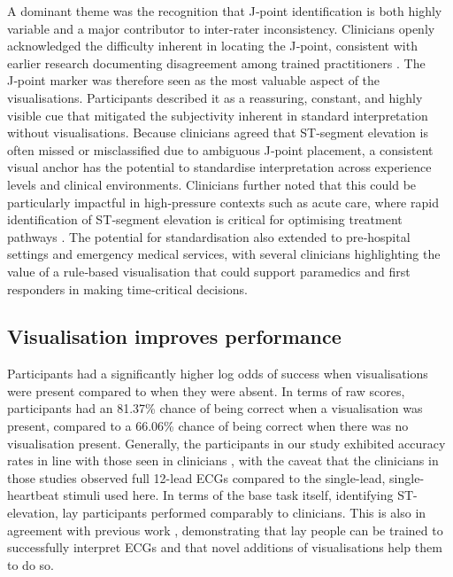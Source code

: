 \documentclass[
  10pt,
  letterpaper,
]{article}
\begin{document}
A dominant theme was the recognition that J‑point identification is both
highly variable and a major contributor to inter-rater inconsistency.
Clinicians openly acknowledged the difficulty inherent in locating the
J‑point, consistent with earlier research documenting disagreement among
trained practitioners \citep{carley_2002, erling_2004}. The J‑point
marker was therefore seen as the most valuable aspect of the
visualisations. Participants described it as a reassuring, constant, and
highly visible cue that mitigated the subjectivity inherent in standard
interpretation without visualisations. Because clinicians agreed that
ST‑segment elevation is often missed or misclassified due to ambiguous
J‑point placement, a consistent visual anchor has the potential to
standardise interpretation across experience levels and clinical
environments. Clinicians further noted that this could be particularly
impactful in high‑pressure contexts such as acute care, where rapid
identification of ST‑segment elevation is critical for optimising
treatment pathways \cite{ibanez_2018}. The potential for standardisation
also extended to pre‑hospital settings and emergency medical services,
with several clinicians highlighting the value of a rule‑based
visualisation that could support paramedics and first responders in
making time‑critical decisions.

\subsection{Visualisation improves
performance}\label{sec-vis-improves-performance}

Participants had a significantly higher log odds of success when
visualisations were present compared to when they were absent. In terms
of raw scores, participants had an 81.37\% chance of being correct when
a visualisation was present, compared to a 66.06\% chance of being
correct when there was no visualisation present. Generally, the
participants in our study exhibited accuracy rates in line with those
seen in clinicians \citep{mccabe_2013, veronese_2016}, with the caveat
that the clinicians in those studies observed full 12-lead ECGs compared
to the single-lead, single-heartbeat stimuli used here. In terms of the
base task itself, identifying ST-elevation, lay participants performed
comparably to clinicians. This is also in agreement with previous work
\citep{alahmadi_2019a, alahmadi_2019b, alahmadi_2020}, demonstrating
that lay people can be trained to successfully interpret ECGs and that
novel additions of visualisations help them to do so.
\end{document}
